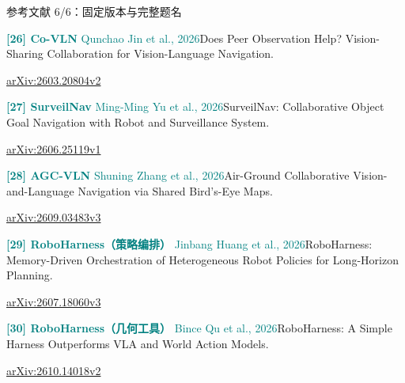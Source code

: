 \documentclass[aspectratio=169,10pt]{beamer}
\begin{document}
\begin{frame}[t,label=refs6]{参考文献 6/6：固定版本与完整题名}
\relax
{\fontsize{8.3}{10.6}\selectfont
\par\textcolor{teal}{\textbf{[26] Co-VLN} Qunchao Jin et al., 2026}\quad Does Peer Observation Help? Vision-Sharing Collaboration for Vision-Language Navigation.\par\href{https://arxiv.org/html/2603.20804v2}{arXiv:2603.20804v2}\par\vspace{1.8mm}
\par\textcolor{teal}{\textbf{[27] SurveilNav} Ming-Ming Yu et al., 2026}\quad SurveilNav: Collaborative Object Goal Navigation with Robot and Surveillance System.\par\href{https://arxiv.org/html/2606.25119v1}{arXiv:2606.25119v1}\par\vspace{1.8mm}
\par\textcolor{teal}{\textbf{[28] AGC-VLN} Shuning Zhang et al., 2026}\quad Air-Ground Collaborative Vision-and-Language Navigation via Shared Bird’s-Eye Maps.\par\href{https://arxiv.org/html/2609.03483v3}{arXiv:2609.03483v3}\par\vspace{1.8mm}
\par\textcolor{teal}{\textbf{[29] RoboHarness（策略编排）} Jinbang Huang et al., 2026}\quad RoboHarness: Memory-Driven Orchestration of Heterogeneous Robot Policies for Long-Horizon Planning.\par\href{https://arxiv.org/html/2607.18060v3}{arXiv:2607.18060v3}\par\vspace{1.8mm}
\par\textcolor{teal}{\textbf{[30] RoboHarness（几何工具）} Bince Qu et al., 2026}\quad RoboHarness: A Simple Harness Outperforms VLA and World Action Models.\par\href{https://arxiv.org/html/2610.14018v2}{arXiv:2610.14018v2}\par\vspace{1.8mm}
}
\end{frame}
\end{document}
